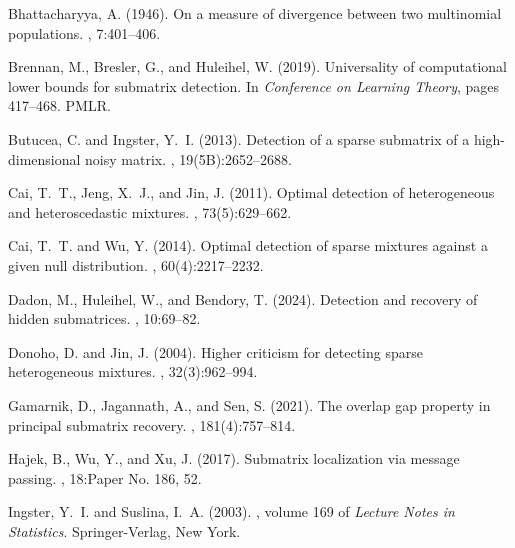 \documentclass[11pt,reqno,letterpaper]{amsart}
\numberwithin{equation}{section}
\theoremstyle{plain}
\begin{document}
\begin{thebibliography}{}
	Bhattacharyya, A. (1946).
	\newblock On a measure of divergence between two multinomial populations.
	, 7:401--406.
	
	Brennan, M., Bresler, G., and Huleihel, W. (2019).
	\newblock Universality of computational lower bounds for submatrix detection.
	\newblock In {\em Conference on Learning Theory}, pages 417--468. PMLR.
	
	Butucea, C. and Ingster, Y.~I. (2013).
	\newblock Detection of a sparse submatrix of a high-dimensional noisy matrix.
	, 19(5B):2652--2688.
	
	Cai, T.~T., Jeng, X.~J., and Jin, J. (2011).
	\newblock Optimal detection of heterogeneous and heteroscedastic mixtures.
	, 73(5):629--662.
	
	Cai, T.~T. and Wu, Y. (2014).
	\newblock Optimal detection of sparse mixtures against a given null
	distribution.
	, 60(4):2217--2232.
	
	Dadon, M., Huleihel, W., and Bendory, T. (2024).
	\newblock Detection and recovery of hidden submatrices.
	, 10:69--82.
	
	Donoho, D. and Jin, J. (2004).
	\newblock Higher criticism for detecting sparse heterogeneous mixtures.
	, 32(3):962--994.
	
	Gamarnik, D., Jagannath, A., and Sen, S. (2021).
	\newblock The overlap gap property in principal submatrix recovery.
	, 181(4):757--814.
	
	Hajek, B., Wu, Y., and Xu, J. (2017).
	\newblock Submatrix localization via message passing.
	, 18:Paper No. 186, 52.
	
	Ingster, Y.~I. and Suslina, I.~A. (2003).
	,
	volume 169 of {\em Lecture Notes in Statistics}.
	\newblock Springer-Verlag, New York.
	

\end{thebibliography}
\end{document}
